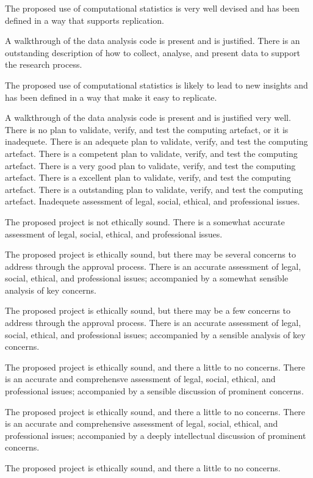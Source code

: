 \begin{markingrubric}
         \par		The proposed use of computational statistics is very well devised and has been defined in a way that supports replication.      
        \par		A walkthrough of the data analysis code is present and is justified.   
        \grade 		There is an outstanding description of how to collect, analyse, and present data to support the research process.
         \par		The proposed use of computational statistics is likely to lead to new insights and has been defined in a way that make it easy to replicate.        
        \par		A walkthrough of the data analysis code is present and is justified very well. 
        \grade\fail 	There is no plan to validate, verify, and test the computing artefact, or it is inadequete.
        \grade 		There is an adequete plan to validate, verify, and test the computing artefact.
        \grade 		There is a competent plan to validate, verify, and test the computing artefact.
        \grade 		There is a very good plan to validate, verify, and test the computing artefact.
        \grade 		There is a excellent plan to validate, verify, and test the computing artefact.
        \grade 		There is a outstanding plan to validate, verify, and test the computing artefact.    
        \grade\fail 	Inadequete assessment of legal, social, ethical, and professional issues.
         \par		The proposed project is not ethically sound.
        \grade 		There is a somewhat accurate assessment of legal, social, ethical, and professional issues.
        \par		The proposed project is ethically sound, but there may be several concerns to address through the approval process.
        \grade 		There is an accurate assessment of legal, social, ethical, and professional issues; accompanied by a somewhat sensible analysis of key concerns.
        \par		The proposed project is ethically sound, but there may be a few concerns to address through the approval process.
        \grade 		There is an accurate assessment of legal, social, ethical, and professional issues; accompanied by a sensible analysis of key concerns.
        \par		The proposed project is ethically sound, and there a little to no concerns.
        \grade 		There is an accurate and comprehensve assessment of legal, social, ethical, and professional issues; accompanied by a sensible discussion of prominent concerns.
        \par		The proposed project is ethically sound, and there a little to no concerns.
        \grade 		There is an accurate and comprehensive assessment of legal, social, ethical, and professional issues; accompanied by a deeply intellectual discussion of prominent concerns.
        \par		The proposed project is ethically sound, and there a little to no concerns.
%
\end{markingrubric}


